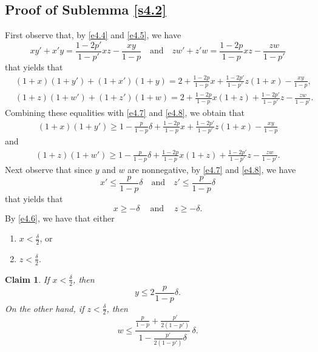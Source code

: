 \documentclass[10pt,a4paper]{amsart}
\newtheorem{claim}[thm]{Claim}
\theoremstyle{remark}
\newcommand{\meg}{\geqslant}
\newcommand{\mik}{\leqslant}
\begin{document}
\subsection{Proof of Sublemma \ref{s4.2}} \label{subsec4.1}

First observe that, by \eqref{e4.4} and \eqref{e4.5}, we have
\begin{equation} \label{e4.12}
xy'+x'y =\frac{1-2p'}{1-p'}xz-\frac{xy}{1-p} \ \ \ \text{ and } \ \ \
zw'+z'w=\frac{1-2p}{1-p}xz-\frac{zw}{1-p'}
\end{equation}
that yields that
\begin{align}
\label{e4.13} & (1+x)(1+y')+(1+x')(1+y)=2+\frac{1-2p}{1-p}x+\frac{1-2p'}{1-p'}z(1+x)-\frac{xy}{1-p}, \\
\label{e4.14} & (1+z)(1+w')+(1+z')(1+w)=2+\frac{1-2p}{1-p}x(1+z)+\frac{1-2p'}{1-p'}z-\frac{zw}{1-p'}.
\end{align}
Combining these equalities with \eqref{e4.7} and \eqref{e4.8}, we obtain that
\begin{align} \label{e4.15}
(1+x)(1+y') \meg 1-\frac{p}{1-p}\delta +\frac{1-2p}{1-p}x+\frac{1-2p'}{1-p'}z(1+x)-\frac{xy}{1-p}
\end{align}
and
\begin{align} \label{e4.16}
(1+z)(1+w') \meg 1-\frac{p}{1-p}\delta + \frac{1-2p}{1-p}x(1+z)+\frac{1-2p'}{1-p'}z-\frac{zw}{1-p'}.
\end{align}
Next observe that since $y$ and $w$ are nonnegative, by \eqref{e4.7} and \eqref{e4.8}, we have
\begin{equation} \label{e4.17}
x'\mik\frac{p}{1-p}\delta \ \ \ \text{ and } \ \ \ z'\mik \frac{p}{1-p}\delta
\end{equation}
that yields that
\begin{equation} \label{e4.18}
x \meg-\delta \ \ \ \ \text{ and } \ \ \ \ z\meg-\delta.
\end{equation}
By \eqref{e4.6}, we have that either
\begin{enumerate}
\item[($\mathcal{A}1$)] $x<\frac{\delta}{2}$, or
\item[($\mathcal{A}2$)] $z<\frac{\delta}{2}$.
\end{enumerate}
\begin{claim} \label{c4.3}
If $x<\frac{\delta}{2}$, then
\begin{equation} \label{e4.19}
y\mik 2\frac{p}{1-p}\delta.
\end{equation}
On the other hand, if $z<\frac{\delta}{2}$, then
\begin{equation} \label{e4.20}
w\mik  \frac{\frac{p}{1-p}+\frac{p'}{2(1-p')}}{1-\frac{p'}{2(1-p')}\delta}\, \delta.
\end{equation}
\end{claim}
\end{document}
